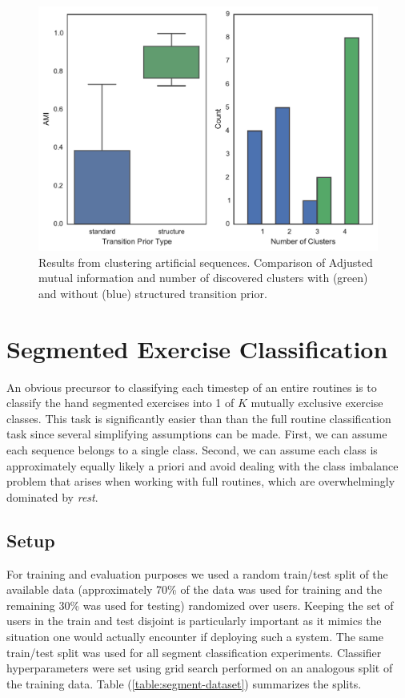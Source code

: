 \documentclass[12pt]{report}
\newcommand{\1}[0]{\mathbbm{1}}
\begin{document}
\begin{figure}[H]
    \centering
    \includegraphics[width=\textwidth]{./img/artificial-cluster-results.pdf}
    \caption{Results from clustering artificial sequences. Comparison of 
    Adjusted mutual information and number of discovered clusters with (green) and without (blue)
    structured transition prior.}
    \label{fig:artificial-cluster-metrics}
\end{figure}


\chapter{Segmented Exercise Classification}
An obvious precursor to classifying each timestep of an entire routines is to classify the hand segmented
exercises into 1 of $K$ mutually exclusive exercise classes. This task is significantly easier than
than the full routine classification task since several simplifying assumptions can be made. First,
we can assume each sequence belongs to a single class. Second, we can assume each class is approximately 
equally likely a priori and avoid dealing with the class imbalance problem that arises when working with
full routines, which are overwhelmingly dominated by \emph{rest}.

\section{Setup}
For training and evaluation purposes we used a random train/test split of the
available data (approximately 70\% of the data was used for training and the remaining
30\% was used for testing) randomized over users. Keeping the set of users in the train and test 
disjoint is particularly important as it mimics the situation one would actually encounter
if deploying such a system. The same train/test split was used for all segment classification
experiments. Classifier hyperparameters were set using grid search performed on an analogous 
split of the training data. Table (\ref{table:segment-dataset}) summarizes the splits.
\end{document}
